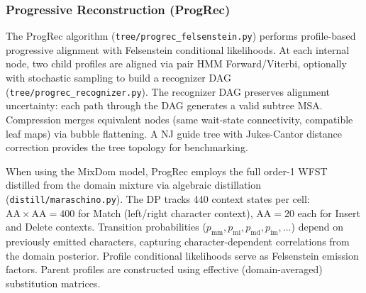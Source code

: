 \subsubsection{Progressive Reconstruction (ProgRec)}
The ProgRec algorithm (\texttt{tree/progrec\_felsenstein.py}) performs
profile-based progressive alignment with Felsenstein conditional likelihoods.
At each internal node, two child profiles are aligned via pair HMM
Forward/Viterbi, optionally with stochastic sampling to build a
recognizer DAG (\texttt{tree/progrec\_recognizer.py}).
The recognizer DAG preserves alignment uncertainty: each path through
the DAG generates a valid subtree MSA. Compression merges
equivalent nodes (same wait-state connectivity, compatible leaf maps)
via bubble flattening. A NJ guide tree with Jukes-Cantor distance
correction provides the tree topology for benchmarking.

When using the MixDom model, ProgRec employs the full order-1 WFST
distilled from the domain mixture via algebraic distillation
(\texttt{distill/maraschino.py}).
The DP tracks 440 context states per cell:
$\text{AA} \times \text{AA} = 400$ for Match (left/right character context),
$\text{AA} = 20$ each for Insert and Delete contexts.
Transition probabilities ($p_{\text{mm}}, p_{\text{mi}}, p_{\text{md}},
p_{\text{im}}, \ldots$) depend on previously emitted characters,
capturing character-dependent correlations from the domain posterior.
Profile conditional likelihoods serve as Felsenstein emission factors.
Parent profiles are constructed using effective (domain-averaged)
substitution matrices.

